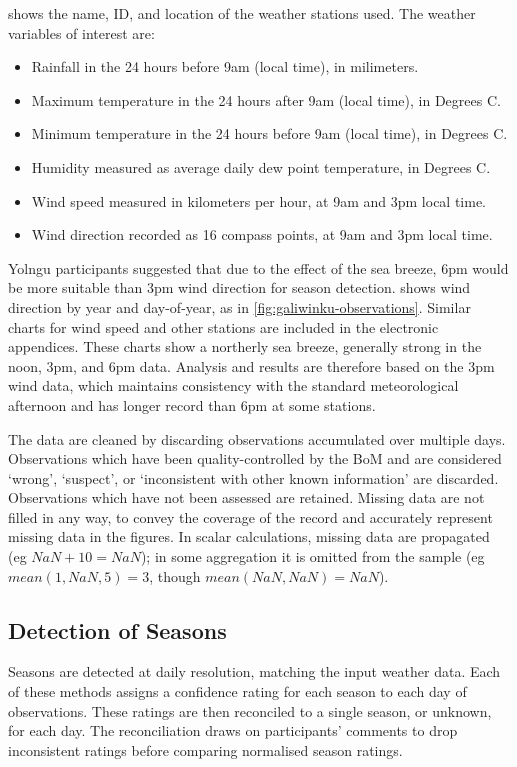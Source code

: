  shows the name, ID, and location of
the weather stations used.
%
The weather variables of interest are:
\begin{itemize}
\item Rainfall in the 24 hours before 9am (local time), in milimeters.
\item Maximum temperature in the 24 hours after 9am (local time), in Degrees C.
\item Minimum temperature in the 24 hours before 9am (local time), in Degrees C.
\item Humidity measured as average daily dew point temperature, in Degrees C.
\item Wind speed measured in kilometers per hour, at 9am and 3pm local time.
\item Wind direction recorded as 16 compass points, at 9am and 3pm local time.
\end{itemize}

Yolngu participants suggested that due to the effect of the sea breeze,
6pm would be more suitable than 3pm wind direction for season detection.
 shows wind direction by year
and day-of-year, as in \cref{fig:galiwinku-observations}.
%
Similar charts for wind speed and other stations are included in the electronic
appendices.  These charts show a northerly sea breeze, generally strong in the
noon, 3pm, and 6pm data.  Analysis and results are therefore based on the 3pm
wind data, which maintains consistency with the standard meteorological
afternoon and has longer record than 6pm at some stations.

The data are cleaned by discarding observations accumulated over multiple days.
Observations which have been quality-controlled by the BoM and are considered
`wrong', `suspect', or `inconsistent with other known information' are discarded.
Observations which have not been assessed are retained.
%
Missing data are not filled in any way, to convey the coverage of the record
and accurately represent missing data in the figures.  In scalar calculations,
missing data are propagated (eg ${NaN+10=NaN}$); in some aggregation
it is omitted from the sample (eg ${mean(1,NaN,5)=3}$, though
${mean(NaN,NaN)=NaN}$).


\subsection{Detection of Seasons}
\label{meth:seas-detection}

Seasons are detected at daily resolution, matching the input weather data.
Each of these methods assigns a confidence rating for each season to each day of
observations.  These ratings are then reconciled to a single season, or unknown,
for each day.  The reconciliation draws on participants' comments to drop inconsistent
ratings before comparing normalised season ratings.

